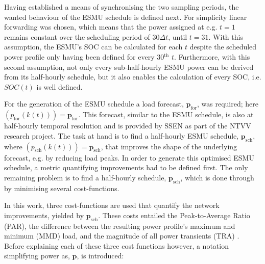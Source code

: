 

Having established a means of synchronising the two sampling periods, the wanted behaviour of the ESMU schedule is defined next.
For simplicity linear forwarding was chosen, which means that the power assigned at e.g. $t=1$ remains constant over the scheduling period of $30\Delta t$, until $t=31$.
With this assumption, the ESMU's SOC can be calculated for each $t$ despite the scheduled power profile only having been defined for every 30$^\text{th}$ $t$.
Furthermore, with this second assumption, not only every sub-half-hourly ESMU power can be derived from its half-hourly schedule, but it also enables the calculation of every SOC, i.e. $SOC(t)$ is well defined.


For the generation of the ESMU schedule a load forecast, $\textbf{p}_\text{for}$, was required; here $(p_\text{for}(k(t))) = \textbf{p}_\text{for}$.
This forecast, similar to the ESMU schedule, is also at half-hourly temporal resolution and is provided by SSEN as part of the NTVV research project.
The task at hand is to find a half-hourly ESMU schedule, $\textbf{p}_\text{sch}$, where $(p_\text{sch}(k(t))) = \textbf{p}_\text{sch}$, that improves the shape of the underlying forecast, e.g. by reducing load peaks.
In order to generate this optimised ESMU schedule, a metric quantifying improvements had to be defined first.
The only remaining problem is to find a half-hourly schedule, $\textbf{p}_\text{sch}$, which is done through by minimising several cost-functions.

In this work, three cost-functions are used that quantify the network improvements, yielded by $\textbf{p}_\text{sch}$.
These costs entailed the Peak-to-Average Ratio (PAR), the difference between the resulting power profile's maximum and minimum (MMD) load, and the magnitude of all power transients (TRA) \cite{Mohsenian-Rad2010, Mostafa2016}.
Before explaining each of these three cost functions however, a notation simplifying power as, $\textbf{p}$, is introduced:

